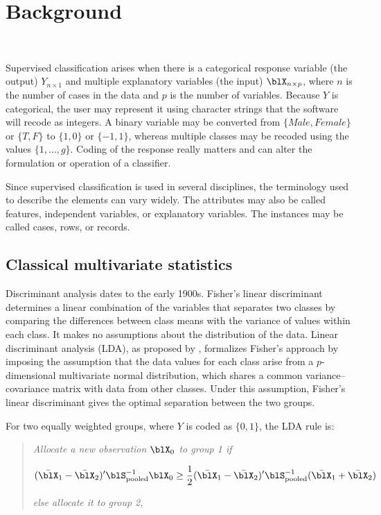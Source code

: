 \section{Background}~\label{class-bg}

Supervised classification arises when there is a categorical response
variable (the output) $Y_{n\times 1}$ and multiple explanatory
variables (the input) $\blX_{n\times p}$, where $n$ is the number of
cases in the data and $p$ is the number of variables. Because $Y$ is
categorical, the user may represent it using character strings that
the software will recode as integers.  A binary variable may be
converted from $\{Male, Female\}$ or $\{T, F \}$ to $\{1, 0\}$ or
$\{-1, 1\}$, whereas multiple classes may be recoded using the values
$\{1, \dots, g\}$.  Coding of the response really matters and can
alter the formulation or operation of a classifier.

Since supervised classification is used in several disciplines, the
terminology used to describe the elements can vary widely.  The
attributes may also be called features, independent variables, or
explanatory variables.  The instances may be called cases, rows, or
records.

\subsection{Classical multivariate statistics}\label{CMS}


Discriminant analysis dates to the early 1900s. Fisher's linear
discriminant \cite{Fi36} determines a linear combination of the
variables that separates two classes by comparing the differences
between class means with the variance of values within each class. It
makes no assumptions about the distribution of the data. Linear
discriminant analysis (LDA), as proposed by ,
formalizes Fisher's approach by imposing the assumption that the data
values for each class arise from a $p$-dimensional multivariate normal
distribution, which shares a common variance--covariance matrix with data
from other classes. Under this assumption, Fisher's linear
discriminant gives the optimal separation between the two groups.

For two equally weighted groups, where $Y$ is coded as $\{0, 1\}$, the LDA rule is:

\begin{quote}
{\em Allocate a new observation $\blX_0$ to group 1 if}

\[
(\bar{\blX}_1-\bar{\blX}_2)'\blS^{-1}_{\rm pooled}\blX_0 \geq 
  \frac{1}{2}(\bar{\blX}_1-\bar{\blX}_2)'\blS^{-1}_{\rm pooled}
  (\bar{\blX}_1+\bar{\blX}_2) 
\]

{\em else allocate it to group 2, }
\end{quote}

